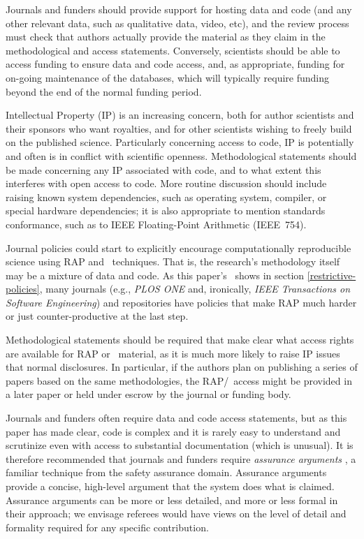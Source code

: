 \documentclass{comjnl}
\begin{document}
Journals and funders should provide support for hosting data and code (and any other relevant data, such as qualitative data, video, etc), and the review process must check that authors actually provide the material as they claim in the methodological and access statements. Conversely, scientists should be able to access funding to ensure data and code access, and, as appropriate, funding for on-going maintenance of the databases, which will typically require funding beyond the end of the normal funding period.

Intellectual Property (IP) is an increasing concern, both for author scientists and their sponsors who want royalties, and for other scientists wishing to freely build on the published science. Particularly concerning access to code, IP is potentially and often is in conflict with scientific openness. Methodological statements should be made concerning any IP associated with code, and to what extent this interferes with open access to code. More routine discussion should include raising known system dependencies, such as operating system, compiler, or special hardware dependencies; it is also appropriate to mention standards conformance, such as to IEEE Floating-Point Arithmetic (IEEE~754).

Journal policies could start to explicitly encourage computationally reproducible science using RAP and \RAPstar\ techniques. That is, the research's methodology itself may be a mixture of data and code. As this paper's \supplement\ shows in section \ref{restrictive-policies}, many journals (e.g., \emph{PLOS ONE\/} and, ironically, \emph{IEEE Transactions on Software Engineering\/}) and repositories have policies that make RAP much harder or just counter-productive at the last step. 

Methodological statements should be required that make clear what access rights are available for RAP or \RAPstar\ material, as it is much more likely to raise IP issues that normal disclosures. In particular, if the authors plan on publishing a series of papers based on the same methodologies, the RAP/\RAPstar\ access might be provided in a later paper or held under escrow by the journal or funding body.

Journals and funders often require data and code access statements, but as this paper has made clear, code is complex and it is rarely easy to understand and scrutinize even with access to substantial documentation (which is unusual). It is therefore recommended that journals and funders require \emph{assurance arguments} \cite{assurance-case}, a familiar technique from the safety assurance domain. Assurance arguments provide a concise, high-level argument that the system does what is claimed. Assurance arguments can be more or less detailed, and more or less formal in their approach; we envisage referees would have views on the level of detail and formality required for any specific contribution.
\end{document}
